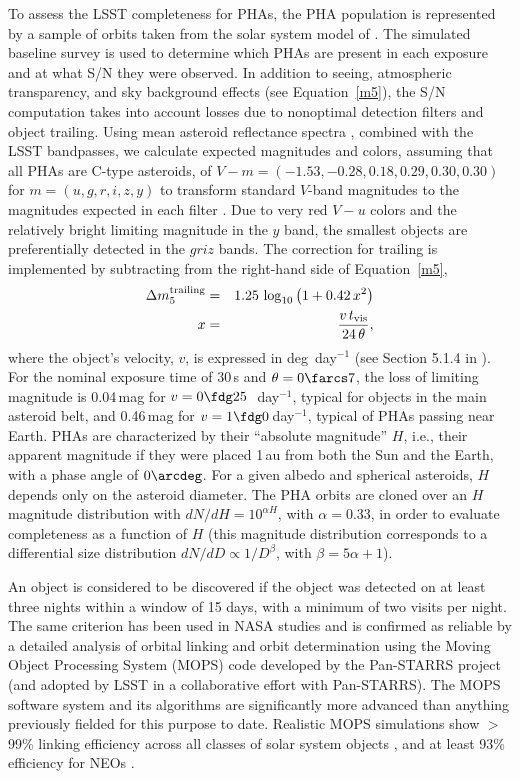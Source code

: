 To assess the LSST completeness for PHAs, the PHA
population is represented by a sample of orbits taken from the solar
system model of \citet{2007AAS...211.4721G}.
The simulated baseline survey is used to determine which PHAs are present in
each exposure and at what S/N they were observed. In
addition to  seeing, atmospheric transparency, and sky background effects
(see Equation~\ref{m5}), the S/N computation takes into account losses
due to nonoptimal detection filters and object trailing. Using mean asteroid reflectance
spectra \citep{2009Icar..202..160D}, combined with the LSST bandpasses,
we calculate expected magnitudes and colors, assuming that all PHAs are C-type asteroids, of
$V-m = (-1.53, -0.28, 0.18, 0.29, 0.30, 0.30)$ for $m=(u, g, r, i, z, y)$ to transform
standard $V$-band magnitudes to the magnitudes expected in each filter \citep{2001AJ....122.2749I}.
Due to very red $V-u$ colors and the relatively bright limiting magnitude in the $y$
band, the smallest objects are preferentially detected in the $griz$ bands.
The correction for trailing is implemented by subtracting from the right-hand
side of Equation~\ref{m5},
\begin{eqnarray}
 \Delta m_5^\mathrm{trailing} & = &1.25\,\log_{10}\left(1+0.42 \, x^2 \right) \\
   x & = & {v \,t_\mathrm{vis} \over 24 \, \theta},
\end{eqnarray}
where the object's velocity, $v$, is expressed in deg~day$^{-1}$ (see Section 5.1.4 in
\citealt{2018Icar..303..181J}).
For the nominal exposure time of 30\,s and $\theta=0\farcs7$, the loss of limiting
magnitude is 0.04\,mag for $v=0\fdg25$\,~day$^{-1}$, typical for objects in the main
asteroid belt, and 0.46\,mag for $v=1\fdg0$\,day$^{-1}$, typical of PHAs passing
near Earth. PHAs are characterized by their ``absolute magnitude''
$H$, i.e., their apparent magnitude if they were placed 1\,au from
both the Sun and the Earth, with a phase angle of $0\arcdeg$.  For a
given albedo and spherical asteroids, $H$ depends only on the asteroid diameter.
The PHA orbits are cloned over an $H$ magnitude distribution with $dN/dH =
10^{\alpha H}$, with $\alpha=0.33$, in order to evaluate completeness as a function of $H$
(this magnitude distribution corresponds to a differential size distribution $dN/dD \propto 1/D^\beta$,
with $\beta = 5\alpha+1$).

An object is considered to be discovered if the object was detected on at least three nights within a
window of 15 days, with a minimum of two visits per night. The same criterion has been used in NASA studies
and is confirmed as reliable by a detailed analysis of orbital linking and orbit determination using the Moving
Object Processing System (MOPS) code \citep{2005AAS...20712102J,2017AJ....154...12V,2017AJ....154...13V} developed by the
Pan-STARRS project (and adopted by LSST in a collaborative effort with Pan-STARRS). The MOPS software
system and its algorithms are significantly more advanced than anything previously
fielded for this purpose to date. Realistic MOPS simulations show
$>$99\% linking efficiency across all classes of solar system objects \citep{2013PASP..125..357D},
and at least 93\% efficiency for NEOs \citep{2017AJ....154...12V,2017AJ....154...13V}.

